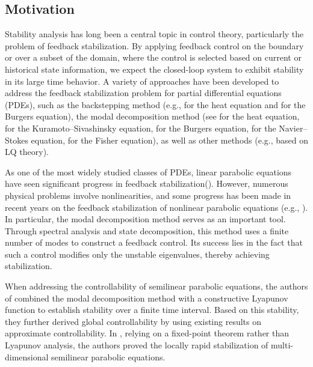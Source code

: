 \documentclass[review]{elsarticle}
\numberwithin{equation}{section}
\begin{document}
\subsection{Motivation}
Stability analysis has long been a central topic in control theory, particularly the problem of feedback stabilization. By applying feedback control on the boundary or over a subset of the domain, where the control is selected based on current or historical state information, we expect the closed-loop system to exhibit stability in its large time behavior. A variety of approaches have been developed to address the feedback stabilization problem for partial differential equations (PDEs), such as the backstepping method (e.g., \cite{CN} for the heat equation and \cite{CX} for the Burgers equation), the modal decomposition method (see \cite{KF,SWZ,X} for the heat equation, \cite{L1} for the Kuramoto–Sivashinsky equation, \cite{LP2,PWF} for the Burgers equation, \cite{X1} for the Navier–Stokes equation, \cite{LHM} for the Fisher equation), as well as other methods (e.g., \cite{BW,TWX} based on LQ theory).

As one of the most widely studied classes of PDEs, linear parabolic equations have seen significant progress in feedback stabilization(\cite{CN,X}). However, numerous physical problems involve nonlinearities, and some progress has been made in recent years on the feedback stabilization of nonlinear parabolic equations (e.g., \cite{B, KF2,KF3,LHM,LP2,LP3,PWF}). In particular, the modal decomposition method serves as an important tool. Through spectral analysis and state decomposition, this method uses a finite number of modes to construct a feedback control. Its success lies in the fact that such a control modifies only the unstable eigenvalues, thereby achieving stabilization.

When addressing the controllability of semilinear parabolic equations, the authors of \cite{CT1} combined the modal decomposition method with a constructive Lyapunov function to establish stability over a finite time interval. Based on this stability, they further derived global controllability by using existing results on approximate controllability. In \cite{B,LHM,M2}, relying on a fixed-point theorem rather than Lyapunov analysis, the authors proved the locally rapid stabilization of multi-dimensional semilinear parabolic equations.
\end{document}
